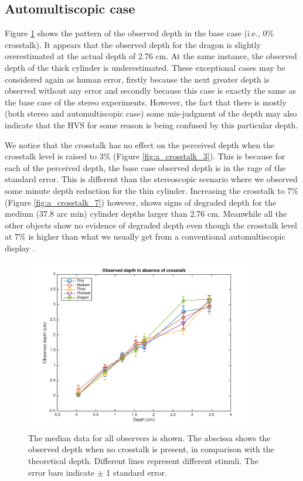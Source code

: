 \subsection{Automultiscopic case}


Figure \ref{fig:a_crosstalk_0} shows the pattern of the observed depth in the base case (i.e., 0\% crosstalk). It appears that the observed depth for the dragon is slightly overestimated at the actual depth of 2.76 cm. At the same instance, the observed depth of the thick cylinder is underestimated. These exceptional cases may be considered again as human error, firstly because the next greater depth is observed without any error and secondly because this case is exactly the same as the base case of the stereo experiments. However, the fact that there is mostly (both stereo and automultiscopic case) some mis-judgment of the depth may also indicate that the HVS for some reason is being confused by this particular depth.

We notice that the crosstalk has no effect on the perceived depth when the crosstalk level is raised to 3\% (Figure \ref{fig:a_crosstalk_3}). This is because for each of the perceived depth, the base case observed depth is in the rage of the standard error. This is different than the stereoscopic scenario where we observed some minute depth reduction for the thin cylinder. Increasing the crosstalk to 7\% (Figure \ref{fig:a_crosstalk_7}) however, shows signs of degraded depth for the medium (37.8 arc min) cylinder depths larger than 2.76 cm. Meanwhile all the other objects show no evidence of degraded depth even though the crosstalk level at 7\% is higher than what we usually get from a conventional automultiscopic display \cite{woods2012crosstalk}.
\begin{figure}[H]
\centering
    \includegraphics[width=0.9\textwidth]{./Template_Figures/a_crosstalk_0}
    \caption{The median data for all observers is shown. The abscissa shows the observed depth when no crosstalk is present, in comparison with the theoretical depth. Different lines represent different stimuli. The error bars indicate $\pm$ 1 standard error.\label{fig:a_crosstalk_0}}
\end{figure}

